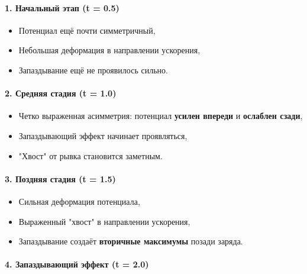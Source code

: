 \documentclass[11pt]{article}
\providecommand{\tightlist}{%
      \setlength{\itemsep}{0pt}\setlength{\parskip}{0pt}}
\begin{document}
\paragraph{\texorpdfstring{1. \textbf{Начальный этап (t =
0.5)}}{1. Начальный этап (t = 0.5)}}\label{ux43dux430ux447ux430ux43bux44cux43dux44bux439-ux44dux442ux430ux43f-t-0.5}

\begin{itemize}
\tightlist
\item
  Потенциал ещё почти симметричный,
\item
  Небольшая деформация в направлении ускорения,
\item
  Запаздывание ещё не проявилось сильно.
\end{itemize}

\paragraph{\texorpdfstring{2. \textbf{Средняя стадия (t =
1.0)}}{2. Средняя стадия (t = 1.0)}}\label{ux441ux440ux435ux434ux43dux44fux44f-ux441ux442ux430ux434ux438ux44f-t-1.0}

\begin{itemize}
\tightlist
\item
  Четко выраженная асимметрия: потенциал \textbf{усилен впереди} и
  \textbf{ослаблен сзади},
\item
  Запаздывающий эффект начинает проявляться,
\item
  "Хвост" от рывка становится заметным.
\end{itemize}

\paragraph{\texorpdfstring{3. \textbf{Поздняя стадия (t =
1.5)}}{3. Поздняя стадия (t = 1.5)}}\label{ux43fux43eux437ux434ux43dux44fux44f-ux441ux442ux430ux434ux438ux44f-t-1.5}

\begin{itemize}
\tightlist
\item
  Сильная деформация потенциала,
\item
  Выраженный "хвост" в направлении ускорения,
\item
  Запаздывание создаёт \textbf{вторичные максимумы} позади заряда.
\end{itemize}

\paragraph{\texorpdfstring{4. \textbf{Запаздывающий эффект (t =
2.0)}}{4. Запаздывающий эффект (t = 2.0)}}\label{ux437ux430ux43fux430ux437ux434ux44bux432ux430ux44eux449ux438ux439-ux44dux444ux444ux435ux43aux442-t-2.0}
\end{document}
